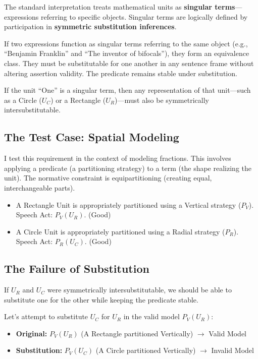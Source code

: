 \documentclass[12pt]{book}
\begin{document}
The standard interpretation treats mathematical units as \textbf{singular terms}---expressions referring to specific objects. Singular terms are logically defined by participation in \textbf{symmetric substitution inferences}.

If two expressions function as singular terms referring to the same object (e.g., ``Benjamin Franklin'' and ``The inventor of bifocals''), they form an equivalence class. They must be substitutable for one another in any sentence frame without altering assertion validity. The predicate remains stable under substitution.

If the unit ``One'' is a singular term, then any representation of that unit---such as a Circle (\(U_C\)) or a Rectangle (\(U_R\))---must also be symmetrically intersubstitutable.

\subsection*{The Test Case: Spatial Modeling}\label{the-test-case-spatial-modeling}

I test this requirement in the context of modeling fractions. This involves applying a predicate (a partitioning strategy) to a term (the shape realizing the unit). The normative constraint is equipartitioning (creating equal, interchangeable parts).

\begin{itemize}

\item
  A Rectangle Unit is appropriately partitioned using a Vertical strategy (\(P_V\)). Speech Act: \(P_V(U_R)\). (Good)
\item
  A Circle Unit is appropriately partitioned using a Radial strategy (\(P_R\)). Speech Act: \(P_R(U_C)\). (Good)
\end{itemize}

\subsection*{The Failure of Substitution}\label{the-failure-of-substitution}

If \(U_R\) and \(U_C\) were symmetrically intersubstitutable, we should be able to substitute one for the other while keeping the predicate stable.

Let's attempt to substitute \(U_C\) for \(U_R\) in the valid model \(P_V(U_R)\):

\begin{itemize}

\item
  \textbf{Original:} \(P_V(U_R)\) (A Rectangle partitioned Vertically) $\rightarrow$ Valid Model
\item
  \textbf{Substitution:} \(P_V(U_C)\) (A Circle partitioned Vertically) $\rightarrow$ Invalid Model
\end{itemize}
\end{document}
